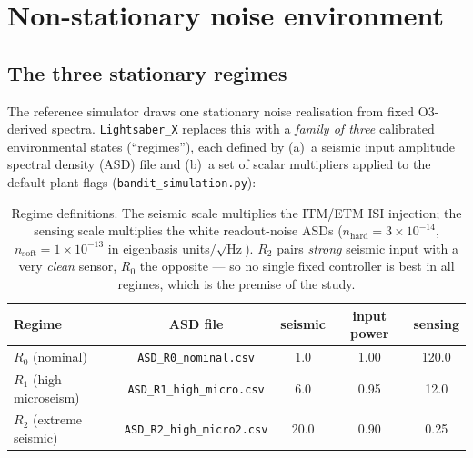 \documentclass[11pt,a4paper]{article}
\newcommand{\code}[1]{\texttt{#1}}
\begin{document}
\section{Non-stationary noise environment}
\label{sec:env}

\subsection{The three stationary regimes}
\label{sec:regimes}

The reference simulator draws one stationary noise realisation from fixed O3-derived
spectra. \code{Lightsaber\_X} replaces this with a \emph{family of three} calibrated
environmental states (``regimes''), each defined by (a)~a seismic input amplitude
spectral density (ASD) file and (b)~a set of scalar multipliers applied to the default
plant flags (\code{bandit\_simulation.py}):

\begin{table}[h]
\centering
\small
\begin{tabular}{lcccc}
\toprule
Regime & ASD file & seismic & input power & sensing\\
\midrule
$R_0$ (nominal)         & \code{ASD\_R0\_nominal.csv}     & 1.0  & 1.00 & 120.0\\
$R_1$ (high microseism) & \code{ASD\_R1\_high\_micro.csv} & 6.0  & 0.95 & 12.0\\
$R_2$ (extreme seismic) & \code{ASD\_R2\_high\_micro2.csv}& 20.0 & 0.90 & 0.25\\
\bottomrule
\end{tabular}
\caption{Regime definitions. The seismic scale multiplies the ITM/ETM ISI injection;
the sensing scale multiplies the white readout-noise ASDs
($n_{\mathrm{hard}}=3\times10^{-14}$, $n_{\mathrm{soft}}=1\times10^{-13}$ in eigenbasis
units$/\sqrt{\mathrm{Hz}}$). $R_2$ pairs \emph{strong} seismic input with a very
\emph{clean} sensor, $R_0$ the opposite --- so no single fixed controller is best in all
regimes, which is the premise of the study.}
\label{tab:regimes}
\end{table}
\end{document}
